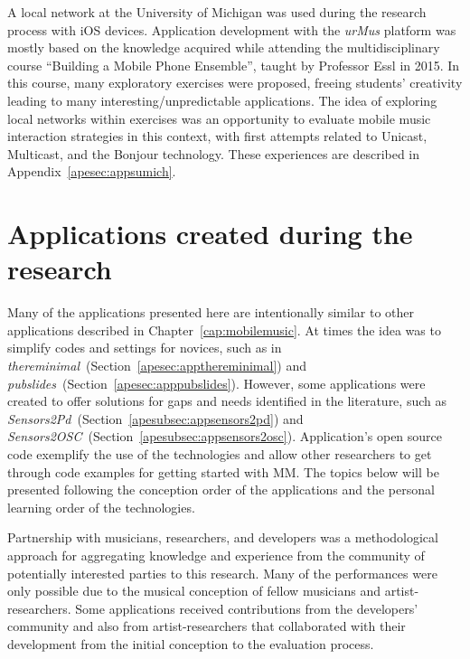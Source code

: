 A local network at the University of Michigan was used during the research process with iOS devices.
Application development with the \textit{urMus} platform was mostly based on the knowledge acquired while attending the multidisciplinary course ``Building a Mobile Phone Ensemble'', taught by Professor Essl in 2015.
In this course, many exploratory exercises were proposed, freeing students' creativity leading to many interesting/unpredictable applications.
The idea of exploring local networks within exercises was an opportunity to evaluate mobile music interaction strategies in this context, with first attempts related to Unicast, Multicast, and the Bonjour technology.
These experiences are described in Appendix~\ref{apesec:appsumich}.

\chapter{Applications created during the research}
\label{ape:applications}

Many of the applications presented here are intentionally similar to other applications described in Chapter~\ref{cap:mobilemusic}. 
At times the idea was to simplify codes and settings for novices, such as in \textit{thereminimal}~(Section~\ref{apesec:appthereminimal}) and \textit{pubslides}~(Section~\ref{apesec:apppubslides}).
However, some applications were created to offer solutions for gaps and needs identified in the literature, such as \textit{Sensors2Pd}~(Section~\ref{apesubsec:appsensors2pd}) and \textit{Sensors2OSC}~(Section~\ref{apesubsec:appsensors2osc}).
Application's open source code exemplify the use of the technologies and allow other researchers to get through code examples for getting started with MM.
The topics below will be presented following the conception order of the applications and the personal learning order of the technologies.

Partnership with musicians, researchers, and developers was a methodological approach for aggregating knowledge and experience from the community of potentially interested parties to this research.
Many of the performances were only possible due to the musical conception of fellow musicians and artist-researchers.
Some applications received contributions from the developers' community and also from artist-researchers that collaborated with their development from the initial conception to the evaluation process.

